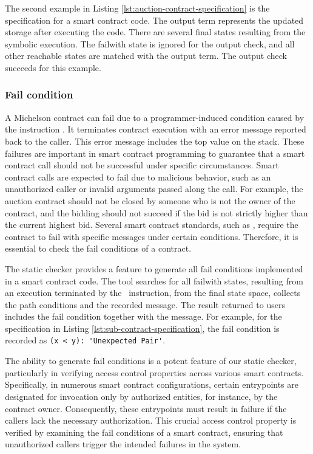 \documentclass[a4paper,USenglish,cleveref, autoref, thm-restate]{lipics-v2021}
\begin{document}
The second example in Listing \ref{lst:auction-contract-specification}
is the specification for a smart contract code. The output term
represents the updated storage after executing the code. There are
several final states resulting from the symbolic execution. The
failwith state is ignored for the output check, and all other
reachable states are matched with the output term. The output check
succeeds for this example.

\subsubsection{Fail condition}
\label{sec:fail-condition}
A Michelson contract can fail due to a programmer-induced condition
caused by the instruction \FAILWITH. It terminates contract execution
with an error message reported back to the caller. This error message
includes the top value on the stack. These failures are important in
smart contract programming to guarantee that a smart contract call
should not be successful under specific circumstances. Smart contract
calls are expected to fail due to malicious behavior, such as an
unauthorized caller or invalid arguments passed along the call. For
example, the auction contract should not be closed by someone who is
not the owner of the contract, and the bidding should not succeed if
the bid is not strictly higher than the current highest bid. Several
smart contract standards, such as
\cite{erc, fa}, require the contract to fail
with specific messages under certain conditions. Therefore, it is
essential to check the fail conditions of a contract.  

The static checker provides a feature to generate all fail conditions
implemented in a smart contract code. The tool searches for all
failwith states, resulting from an execution terminated by the
\FAILWITH\ instruction, from the final state space, collects the path
conditions and the recorded message. The result returned to users
includes the fail condition together with the message. For example,
for the specification in Listing \ref{lst:sub-contract-specification},
the fail condition is recorded as
\lstinline/(x < y): 'Unexpected Pair'/.  

The ability to generate fail conditions is a potent feature of our
static checker, particularly in verifying access control properties
across various smart contracts. Specifically, in numerous smart
contract configurations, certain entrypoints are designated for
invocation only by authorized entities, for instance, by the contract
owner. Consequently, these entrypoints must result in failure if the
callers lack the necessary authorization. This crucial access control
property is verified by examining the fail conditions of a smart
contract, ensuring that unauthorized callers trigger the intended
failures in the system. 
\end{document}
